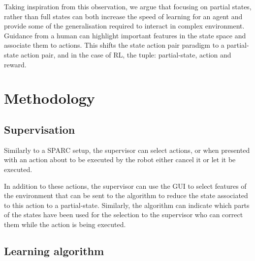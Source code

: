 \documentclass[letterpaper]{article} %
\begin{document}
Taking inspiration from this observation, we argue that focusing on partial states, rather
than full states can both increase the speed of learning for an agent and
provide some of the generalisation required to interact in complex environment.
Guidance from a human can highlight important features in the state space and
associate them to actions. This shifts the state action pair paradigm to a
partial-state action pair, and in the case of RL, the tuple: partial-state,
action and reward. 





\section{Methodology}

\subsection{Supervisation}
Similarly to a SPARC setup, the supervisor can select actions, or when presented
with an action about to be executed by the robot either cancel it or let
it be executed.

In addition to these actions, the supervisor can use the GUI to select features
of the environment that can be sent to the algorithm to reduce the state associated
to this action to a partial-state. Similarly, the algorithm can indicate which
parts of the states have been used for the selection to the supervisor who can
correct them while the action is being executed.


\subsection{Learning algorithm}
\end{document}
